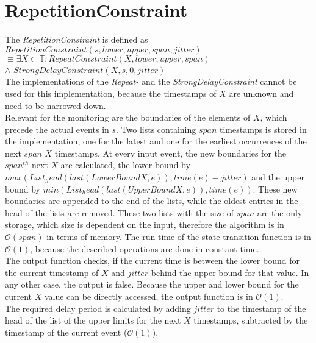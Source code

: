 \section{RepetitionConstraint}
	The  \emph{RepetitionConstraint} is defined as\\[10pt]
		$RepetitionConstraint(s, lower, upper, span, jitter)$\\
		$\equiv \exists X\subset \mathbb{T}: RepeatConstraint (X, lower, upper, span)$\\
		\hspace{7cm}$\land$ $StrongDelayConstraint(X, s, 0, jitter)$\\[10pt]
	The implementations of the \emph{Repeat-} and the \emph{StrongDelayConstraint} cannot be used for this implementation, because the timestamps of $X$ are unknown and need to be narrowed down.\\
	Relevant for the monitoring are the boundaries of the elements of $X$, which precede the actual events in $s$. Two lists containing $span$ timestamps is stored in the implementation, one for the latest and one for the earliest occurrences of the next $span$ $X$ timestamps. At every input event, the new boundaries for the $span^{th}$ next $X$ are calculated, the lower bound by $max(List_head(last(LowerBoundX, e)), time(e)-jitter)$ and the upper bound by $min(List_head(last(UpperBoundX, e)), time(e))$. These new boundaries are appended to the end of the lists, while the oldest entries in the head of the lists are removed. These two lists with the size of $span$ are the only storage, which size is dependent on the input, therefore the algorithm is in $\mathcal{O}(span)$ in terms of memory. The run time of the state transition function is in $\mathcal{O}(1)$, because the described operations are done in constant time.\\
	The output function checks, if the current time is between the lower bound for the current timestamp of $X$ and $jitter$ behind the upper bound for that value. In any other case, the output is false. Because the upper and lower bound for the current $X$ value can be directly accessed, the output function is in $\mathcal{O}(1)$.\\
	The required delay period is calculated by adding $jitter$ to the timestamp of the head of the list of the upper limits for the next $X$ timestamps, subtracted by the timestamp of the current event ($\mathcal{O}(1)$).
	
